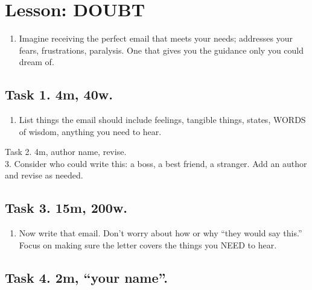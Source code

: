 \documentclass[
]{book}
\providecommand{\tightlist}{%
  \setlength{\itemsep}{0pt}\setlength{\parskip}{0pt}}
\begin{document}
\hypertarget{lesson-doubt}{%
\chapter{Lesson: DOUBT}\label{lesson-doubt}}

\begin{enumerate}
\def\labelenumi{\arabic{enumi}.}
\tightlist
\item
  Imagine receiving the perfect email that meets your needs; addresses
  your fears, frustrations, paralysis. One that gives you the guidance
  only you could dream of.
\end{enumerate}

\hypertarget{task-1.-4m-40w.}{%
\section{Task 1. 4m, 40w.}\label{task-1.-4m-40w.}}

\begin{enumerate}
\def\labelenumi{\arabic{enumi}.}
\setcounter{enumi}{1}
\tightlist
\item
  List things the email should include feelings, tangible things,
  states, WORDS of wisdom, anything you need to hear.
\end{enumerate}

Task 2. 4m, author name, revise.\\
3. Consider who could write this: a boss, a best friend, a stranger. Add
an author and revise as needed.

\hypertarget{task-3.-15m-200w.}{%
\section{Task 3. 15m, 200w.}\label{task-3.-15m-200w.}}

\begin{enumerate}
\def\labelenumi{\arabic{enumi}.}
\setcounter{enumi}{3}
\tightlist
\item
  Now write that email. Don't worry about how or why ``they would say
  this.'' Focus on making sure the letter covers the things you NEED to
  hear.
\end{enumerate}

\hypertarget{task-4.-2m-your-name.}{%
\section{Task 4. 2m, ``your name''.}\label{task-4.-2m-your-name.}}
\end{document}
